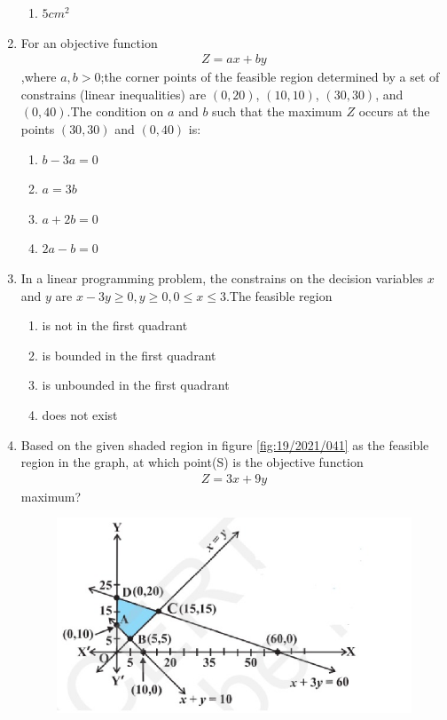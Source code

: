 \begin{enumerate}
\begin{enumerate}
    \item $5cm^2$
\end{enumerate}
\item For an objective function 
\begin{align}
	Z=ax+by
\end{align}		
		,where $a,b>0$;the corner points of the feasible region determined by a set of constrains (linear inequalities) are $(0,20)$, $(10,10)$, $(30,30)$, and $(0,40)$.The condition on $a$ and $b$ such that the maximum $Z$ occurs at the points $(30,30)$ and $(0,40)$ is: 
\begin{enumerate}
    \item $b-3a=0$
    \item $a=3b$
    \item $a+2b=0$
    \item $2a-b=0$
\end{enumerate}
\item In a linear programming problem, the constrains on the decision variables $x$ and $y$ are $x-3y \geq 0, y \geq 0, 0\leq x \leq 3$.The feasible region 
\begin{enumerate}
    \item is not in the first quadrant
    \item is bounded in the first quadrant 
    \item is unbounded in the first quadrant 
    \item does not exist  
\end{enumerate}
\item Based on the given shaded region in figure \ref{fig:19/2021/041} as the feasible region in the graph, at which point(S) is the objective function 
\begin{align}
	Z=3x+9y 
\end{align}
		maximum?
\begin{figure}[h]
    \centering{}
    \includegraphics[width=\columnwidth]{figs/opti-21-fig1.jpg}

\end{figure}
\end{enumerate}
